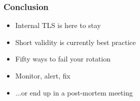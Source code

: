
\begin{frame}
\frametitle{Conclusion}

\begin{itemize}
\item Internal TLS is here to stay
\item Short validity is currently best practice
\item Fifty ways to fail your rotation
\item Monitor, alert, fix \pause
\item ...or end up in a post-mortem meeting
\end{itemize}
\end{frame}






